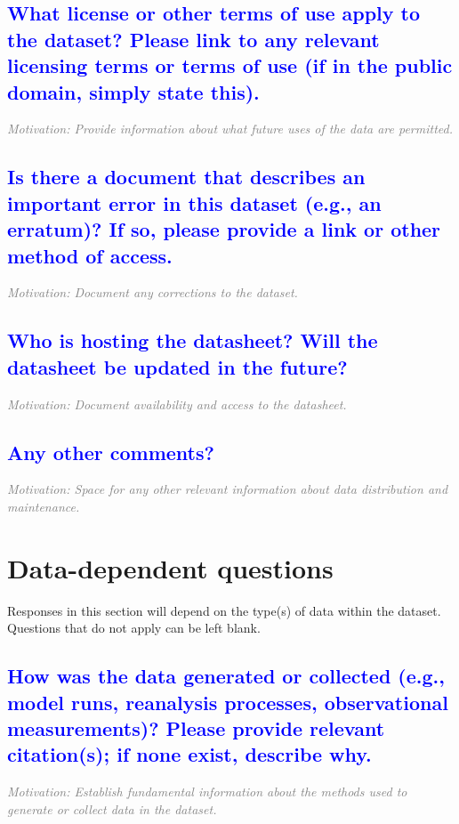 \documentclass[letterpaper, 10 pt, transmag]{IEEEtran}
\begin{document}
\textcolor{blue}{\subsection{What license or other terms of use apply to the dataset? Please link to any relevant licensing terms or terms of use (if in the public domain, simply state this).}}
\textcolor{gray}{\textit{Motivation: Provide information about what future uses of the data are permitted.}}

\textcolor{blue}{\subsection{Is there a document that describes an important error in this dataset (e.g., an erratum)? If so, please provide a link or other method of access.}}
\textcolor{gray}{\textit{Motivation: Document any corrections to the dataset.}}

\textcolor{blue}{\subsection{Who is hosting the datasheet? Will the datasheet be updated in the future?}}
\textcolor{gray}{\textit{Motivation: Document availability and access to the datasheet.}}

\textcolor{blue}{\subsection{Any other comments?}}
\textcolor{gray}{\textit{Motivation: Space for any other relevant information about data distribution and maintenance.}}
\vspace{10mm}

\section{Data-dependent questions}
Responses in this section will depend on the type(s) of data within the dataset. Questions that do not apply can be left blank.


\textcolor{blue}{\subsection{How was the data generated or collected (e.g., model runs, reanalysis processes, observational measurements)? Please provide relevant citation(s); if none exist, describe why.}}
\textcolor{gray}{\textit{Motivation: Establish fundamental information about the methods used to generate or collect data in the dataset.}}
\end{document}
